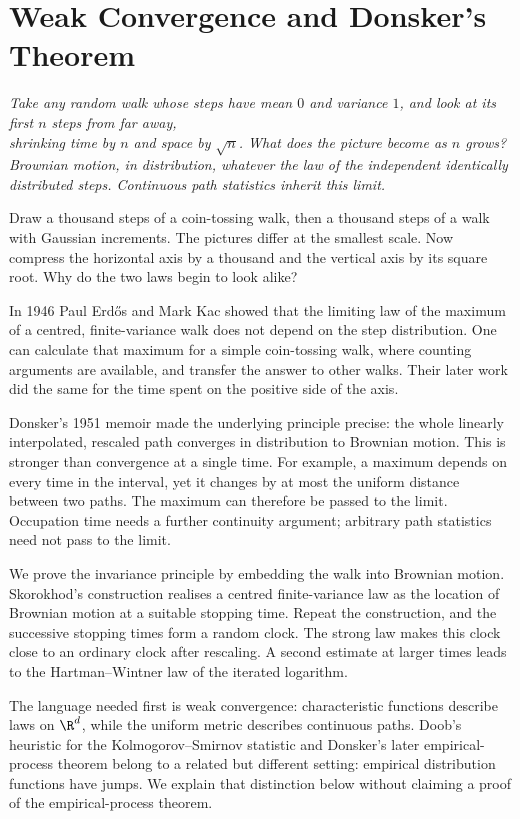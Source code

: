 \chapter{Weak Convergence and Donsker's Theorem}
\begin{center}\itshape
Take any random walk whose steps have mean $0$ and variance $1$, and look at its first $n$ steps from far away,\\
shrinking time by $n$ and space by $\sqrt n$. What does the picture become as $n$ grows?\\
Brownian motion, in distribution, whatever the law of the independent identically distributed steps. Continuous path statistics inherit this limit.
\end{center}

Draw a thousand steps of a coin-tossing walk, then a thousand steps of a walk with Gaussian increments. The pictures differ at the smallest scale. Now compress the horizontal axis by a thousand and the vertical axis by its square root. Why do the two laws begin to look alike?

In 1946 Paul Erd\H{o}s and Mark Kac showed that the limiting law of the maximum of a centred, finite-variance walk does not depend on the step distribution. One can calculate that maximum for a simple coin-tossing walk, where counting arguments are available, and transfer the answer to other walks. Their later work did the same for the time spent on the positive side of the axis.

Donsker's 1951 memoir made the underlying principle precise: the whole linearly interpolated, rescaled path converges in distribution to Brownian motion. This is stronger than convergence at a single time. For example, a maximum depends on every time in the interval, yet it changes by at most the uniform distance between two paths. The maximum can therefore be passed to the limit. Occupation time needs a further continuity argument; arbitrary path statistics need not pass to the limit.

We prove the invariance principle by embedding the walk into Brownian motion. Skorokhod's construction realises a centred finite-variance law as the location of Brownian motion at a suitable stopping time. Repeat the construction, and the successive stopping times form a random clock. The strong law makes this clock close to an ordinary clock after rescaling. A second estimate at larger times leads to the Hartman--Wintner law of the iterated logarithm.

The language needed first is weak convergence: characteristic functions describe laws on $\R^d$, while the uniform metric describes continuous paths. Doob's heuristic for the Kolmogorov--Smirnov statistic and Donsker's later empirical-process theorem belong to a related but different setting: empirical distribution functions have jumps. We explain that distinction below without claiming a proof of the empirical-process theorem.

